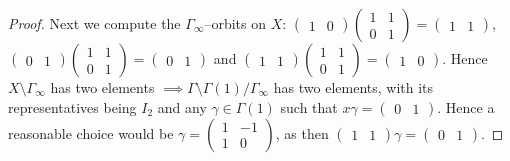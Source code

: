 \documentclass{article}
\theoremstyle{definition}
\begin{document}
\begin{proof}
    Next we compute the $\Gamma_{\infty}$--orbits on $X$: $\begin{pmatrix} 1 & 0 \end{pmatrix}\begin{pmatrix}  1 &1\\0&1 \end{pmatrix} = \begin{pmatrix} 1&1 \end{pmatrix}$, $\begin{pmatrix} 0 & 1  \end{pmatrix}\begin{pmatrix}  1 &1\\0&1 \end{pmatrix} = \begin{pmatrix} 0&1 \end{pmatrix}$ and $\begin{pmatrix} 1 & 1 \end{pmatrix}\begin{pmatrix}  1 &1\\0&1 \end{pmatrix} = \begin{pmatrix} 1&0 \end{pmatrix}$. Hence $X \setminus \Gamma_{\infty}$ has two elements $\implies \Gamma\setminus \Gamma(1) / \Gamma_{\infty}$ has two elements, with its representatives being $I_2$ and any $\gamma \in \Gamma(1)$ such that $x \gamma = \begin{pmatrix} 0 &1 \end{pmatrix}$. Hence a reasonable choice would be $\gamma = \begin{pmatrix} 1 & -1 \\ 1 & 0 \end{pmatrix}$, as then $\begin{pmatrix} 1&1 \end{pmatrix}\gamma = \begin{pmatrix} 0&1 \end{pmatrix}$.
    \vspace{1mm}
     

\end{proof}
\end{document}
